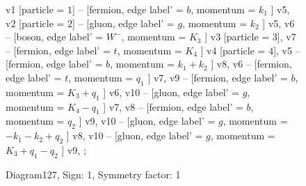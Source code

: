 \documentclass{revtex4}
\begin{document}
\begin{figure}[!htb]
\begin{center}
{v1 [particle = \(1\)] -- [fermion, edge label' = \(b\), momentum = \(k_{1}\) ] v5, 
v2 [particle = \(2\)] -- [gluon, edge label' = \(g\), momentum = \(k_{2}\) ] v5, 
v6 -- [boson, edge label' = \(W^{-}\), momentum = \(K_{3}\) ] v3 [particle = \(3\)], 
v7 -- [fermion, edge label' = \(t\), momentum = \(K_{4}\) ] v4 [particle = \(4\)], 
v5 -- [fermion, edge label' = \(b\), momentum = \(k_{1} + k_{2}\) ] v8, 
v6 -- [fermion, edge label' = \(t\), momentum = \(q_{1}\) ] v7, 
v9 -- [fermion, edge label' = \(b\), momentum = \(K_{3} + q_{1}\) ] v6, 
v10 -- [gluon, edge label' = \(g\), momentum = \(K_{4} - q_{1}\) ] v7, 
v8 -- [fermion, edge label' = \(b\), momentum = \(q_{2}\) ] v9, 
v10 -- [gluon, edge label' = \(g\), momentum = \(-k_{1} - k_{2} + q_{2}\) ] v8, 
v10 -- [gluon, edge label' = \(g\), momentum = \(K_{3} + q_{1} - q_{2}\) ] v9, 
};
\end{center}
\caption{Diagram127, Sign: 1, Symmetry factor: 1}
\end{figure}
\newpage
\end{document}
